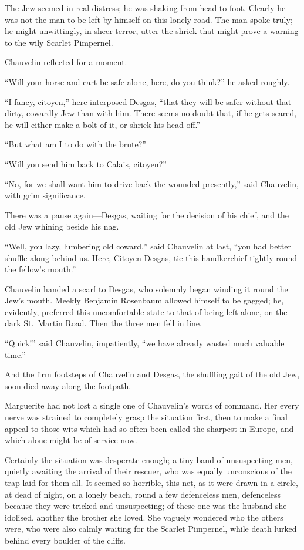 \documentclass[paper=a5,BCOR=7mm,twoside,DIV=calc,12pt,usegeometry,chapterprefix,endperiod,headings=big]{scrbook}
\begin{document}
The Jew seemed in real distress; he was shaking from head to foot. Clearly he was not the man to be left by himself on this lonely road. The man spoke truly; he might unwittingly, in sheer terror, utter the shriek that might prove a warning to the wily Scarlet Pimpernel.

Chauvelin reflected for a moment.

\enquote{Will your horse and cart be safe alone, here, do you think?} he asked roughly.

\enquote{I fancy, citoyen,} here interposed Desgas, \enquote{that they will be safer without that dirty, cowardly Jew than with him. There seems no doubt that, if he gets scared, he will either make a bolt of it, or shriek his head off.}

\enquote{But what am I to do with the brute?}

\enquote{Will you send him back to Calais, citoyen?}

\enquote{No, for we shall want him to drive back the wounded presently,} said Chauvelin, with grim significance.

There was a pause again---Desgas, waiting for the decision of his chief, and the old Jew whining beside his nag.

\enquote{Well, you lazy, lumbering old coward,} said Chauvelin at last, \enquote{you had better shuffle along behind us. Here, Citoyen Desgas, tie this handkerchief tightly round the fellow's mouth.}

Chauvelin handed a scarf to Desgas, who solemnly began winding it round the Jew's mouth. Meekly Benjamin Rosenbaum allowed himself to be gagged; he, evidently, preferred this uncomfortable state to that of being left alone, on the dark St.~Martin Road. Then the three men fell in line.

\enquote{Quick!} said Chauvelin, impatiently, \enquote{we have already wasted much valuable time.}

And the firm footsteps of Chauvelin and Desgas, the shuffling gait of the old Jew, soon died away along the footpath.

Marguerite had not lost a single one of Chauvelin's words of command. Her every nerve was strained to completely grasp the situation first, then to make a final appeal to those wits which had so often been called the sharpest in Europe, and which alone might be of service now.

Certainly the situation was desperate enough; a tiny band of unsuspecting men, quietly awaiting the arrival of their rescuer, who was equally unconscious of the trap laid for them all. It seemed so horrible, this net, as it were drawn in a circle, at dead of night, on a lonely beach, round a few defenceless men, defenceless because they were tricked and unsuspecting; of these one was the husband she idolised, another the brother she loved. She vaguely wondered who the others were, who were also calmly waiting for the Scarlet Pimpernel, while death lurked behind every boulder of the cliffs.
\end{document}
